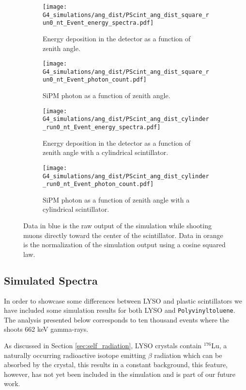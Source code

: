 \begin{figure}[H]
  \centering
  \begin{subfigure}[t]{0.49\textwidth}
    \texttt{[image: G4\_simulations/ang\_dist/PScint\_ang\_dist\_square\_run0\_nt\_Event\_energy\_spectra.pdf]}
    \caption{\label{sfig:ang_edep}Energy deposition in the detector as a function of zenith angle.}
  \end{subfigure}
  \hfill
  \begin{subfigure}[t]{0.49\textwidth}
    \texttt{[image: G4\_simulations/ang\_dist/PScint\_ang\_dist\_square\_run0\_nt\_Event\_photon\_count.pdf]}
    \caption{\label{sfig:ang_pcount}SiPM photon as a function of zenith angle.}
  \end{subfigure}
  \medskip
  \begin{subfigure}[t]{0.49\textwidth}
    \texttt{[image: G4\_simulations/ang\_dist/PScint\_ang\_dist\_cylinder\_run0\_nt\_Event\_energy\_spectra.pdf]}
    \caption{\label{sfig:ang_edep_cylinder}Energy deposition in the detector as a function of zenith angle with a cylindrical scintillator.}
  \end{subfigure}
  \hfill
  \begin{subfigure}[t]{0.49\textwidth}
    \texttt{[image: G4\_simulations/ang\_dist/PScint\_ang\_dist\_cylinder\_run0\_nt\_Event\_photon\_count.pdf]}
    \caption{\label{sfig:ang_pcount_cylinder}SiPM photon as a function of zenith angle with a cylindrical scintillator.}
  \end{subfigure}
  \caption{\label{fig:ang_results}Data in blue is the raw output of the simulation while shooting muons directly toward the center of the scintillator. Data in orange is the normalization of the simulation output using a cosine squared law.}
\end{figure}

\subsection{Simulated Spectra}\label{sec:simulated_spectra}

In order to showcase some differences between LYSO and plastic scintillators we have included some simulation results for both LYSO and \texttt{Polyvinyltoluene}. The analysis presented below corresponds to ten thousand events where the \gps~ shoots 662 \unit{\kilo\eV} gamma-rays.

As discussed in Section \ref{sec:self_radiation}, LYSO crystals contain $^{176}$Lu, a naturally occurring radioactive isotope emitting $\beta$ radiation which can be absorbed by the crystal, this results in a constant background, this feature, however, has not yet been included in the simulation and is part of our future work.

